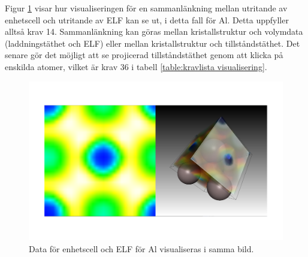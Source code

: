 \documentclass[a4paper,12pt]{article}
\begin{document}
Figur \ref{fig:visualisering_sammanlankning} visar hur visualiseringen för en sammanlänkning mellan utritande av enhetscell och utritande av ELF kan se ut, i detta fall för Al. Detta uppfyller alltså krav 14. Sammanlänkning kan göras mellan kristallstruktur och volymdata (laddningstäthet och ELF) eller mellan kristallstruktur och tillståndstäthet. Det senare gör det möjligt att se projicerad tillståndstäthet genom att klicka på enskilda atomer, vilket är krav 36 i tabell \ref{table:kravlista visualisering}.
\begin{figure}[H]
	\centering
	\includegraphics[scale=0.2]{sammanlankning_visualisering_Al.png}
	\caption{Data för enhetscell och ELF för Al visualiseras i samma bild.}
	\label{fig:visualisering_sammanlankning}
\end{figure}
\end{document}
